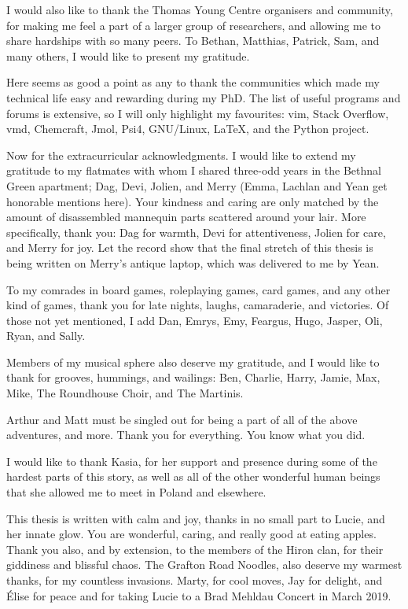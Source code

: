 \documentclass[
11pt, %
english, %
singlespacing, %
headsepline, %
]{MastersDoctoralThesis} %
\begin{document}
\begin{acknowledgements}
I would also like to thank the Thomas Young Centre organisers and community, for making me feel a part of a larger group of researchers, and allowing me to share hardships with so many peers. To Bethan, Matthias, Patrick, Sam, and many others, I would like to present my gratitude.

Here seems as good a point as any to thank the communities which made my technical life easy and rewarding during my PhD. The list of useful programs and forums is extensive, so I will only highlight my favourites: vim, Stack Overflow, vmd, Chemcraft, Jmol, Psi4, GNU/Linux, \LaTeX{}, and the Python project.

Now for the extracurricular acknowledgments. I would like to extend my gratitude to my flatmates with whom I shared three-odd years in the Bethnal Green apartment; Dag, Devi, Jolien, and Merry (Emma, Lachlan and Yean get honorable mentions here). Your kindness and caring are only matched by the amount of disassembled mannequin parts scattered around your lair. More specifically, thank you: Dag for warmth, Devi for attentiveness, Jolien for care, and Merry for joy. Let the record show that the final stretch of this thesis is being written on Merry’s antique laptop, which was delivered to me by Yean.

To my comrades in board games, roleplaying games, card games, and any other kind of games, thank you for late nights, laughs, camaraderie, and victories. Of those not yet mentioned, I add Dan, Emrys, Emy, Feargus, Hugo, Jasper, Oli, Ryan, and Sally.

Members of my musical sphere also deserve my gratitude, and I would like to thank for grooves, hummings, and wailings: Ben, Charlie, Harry, Jamie, Max, Mike, The Roundhouse Choir, and The Martinis.

Arthur and Matt must be singled out for being a part of all of the above adventures, and more. Thank you for everything. You know what you did.

I would like to thank Kasia, for her support and presence during some of the hardest parts of this story, as well as all of the other wonderful human beings that she allowed me to meet in Poland and elsewhere.

This thesis is written with calm and joy, thanks in no small part to Lucie, and her innate glow. You are wonderful, caring, and really good at eating apples. Thank you also, and by extension, to the members of the Hiron clan, for their giddiness and blissful chaos. The Grafton Road Noodles, also deserve my warmest thanks, for my countless invasions. Marty, for cool moves, Jay for delight, and \'Elise for peace and for taking Lucie to a Brad Mehldau Concert in March 2019.


\end{acknowledgements}
\end{document}
